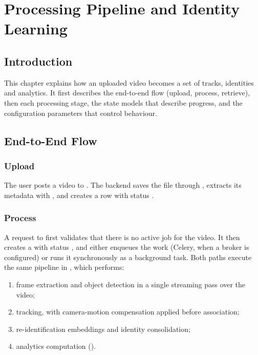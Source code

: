 \chapter{Processing Pipeline and Identity Learning}

\section{Introduction}

This chapter explains how an uploaded video becomes a set of tracks, identities and analytics. It first describes the end-to-end flow (upload, process, retrieve), then each processing stage, the state models that describe progress, and the configuration parameters that control behaviour.

\section{End-to-End Flow}

\subsection{Upload}

The user posts a video to . The backend saves the file through , extracts its metadata with , and creates a  row with status .

\subsection{Process}

A request to  first validates that there is no active job for the video. It then creates a  with status , and either enqueues the work (Celery, when a broker is configured) or runs it synchronously as a background task. Both paths execute the same pipeline in , which performs:

\begin{enumerate}
  \item frame extraction and object detection in a single streaming pass over the video;
  \item tracking, with camera-motion compensation applied before association;
  \item re-identification embeddings and identity consolidation;
  \item analytics computation ().
\end{enumerate}

